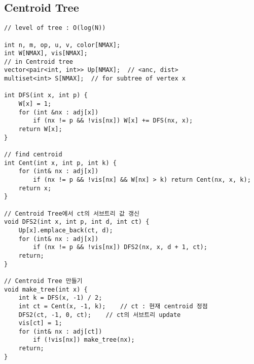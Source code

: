 \documentclass[landscape, 8pt, a4paper, oneside, twocolumn]{extarticle}
\begin{document}
\subsection {Centroid Tree}
\begin{verbatim}
// level of tree : O(log(N))

int n, m, op, u, v, color[NMAX];
int W[NMAX], vis[NMAX];
// in Centroid tree
vector<pair<int, int>> Up[NMAX];  // <anc, dist>
multiset<int> S[NMAX];  // for subtree of vertex x

int DFS(int x, int p) {
    W[x] = 1;
    for (int &nx : adj[x])
        if (nx != p && !vis[nx]) W[x] += DFS(nx, x);
    return W[x];
}

// find centroid
int Cent(int x, int p, int k) {
    for (int& nx : adj[x])
        if (nx != p && !vis[nx] && W[nx] > k) return Cent(nx, x, k);
    return x;
}

// Centroid Tree에서 ct의 서브트리 값 갱신
void DFS2(int x, int p, int d, int ct) {
    Up[x].emplace_back(ct, d);
    for (int& nx : adj[x])
        if (nx != p && !vis[nx]) DFS2(nx, x, d + 1, ct);
    return;
}

// Centroid Tree 만들기
void make_tree(int x) {
    int k = DFS(x, -1) / 2;
    int ct = Cent(x, -1, k);    // ct : 현재 centroid 정점
    DFS2(ct, -1, 0, ct);    // ct의 서브트리 update
    vis[ct] = 1;
    for (int& nx : adj[ct])
        if (!vis[nx]) make_tree(nx);
    return;
}
\end{verbatim}
\newpage
\end{document}
